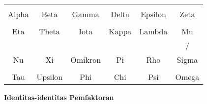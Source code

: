 \documentclass[12pt, a4paper]{article}\usepackage[utf8]{inputenc}
\theoremstyle{plain}
\theoremstyle{plain}
\numberwithin{equation}{section}
\theoremstyle{definition}
\begin{document}
	\begin{table}[!h]
		\centering
		
		\begin{tabular}{cccccc}
			{\LARGErr \textAlpha   \textalpha} \qquad \qquad &  {\LARGErr \textBeta   \textbeta} \qquad \qquad &   {\LARGErr\textGamma   \textgamma} \qquad \qquad &   {\LARGErr\textDelta   \textdelta} \qquad \qquad &   {\LARGErr\textEpsilon   \textepsilon} \qquad \qquad  &   {\LARGErr \textZeta   \textzeta}  \\
			Alpha \qquad \qquad & Beta \qquad \qquad & Gamma \qquad \qquad & Delta \qquad \qquad & Epsilon \qquad \qquad & Zeta \\[2em]
			{\LARGErr \textEta   \texteta} \qquad \qquad &  {\LARGErr \textTheta   \texttheta} \qquad \qquad &  {\LARGErr \textIota   \textiota} \qquad \qquad &  {\LARGErr \textKappa   \textkappa} \qquad \qquad &  {\LARGErr \textLambda   \textlambda} \qquad \qquad &   {\LARGErr \textMu   \textmu}  \\
			Eta \qquad \qquad & Theta \qquad \qquad & Iota \qquad \qquad & Kappa \qquad \qquad & Lambda \qquad \qquad & Mu \\[2em]
			{\LARGErr \textNu   \textnu} \qquad \qquad &  {\LARGErr \textXi   \textxi} \qquad \qquad &  {\LARGErr \textOmikron   \textomikron} \qquad \qquad &  {\LARGErr \textPi   \textpi} \qquad \qquad &  {\LARGErr \textRho   \textrho} \qquad \qquad &  {\LARGErr \textSigma  \textsigma/\textvarsigma}  \\
			Nu \qquad \qquad & Xi \qquad \qquad & Omikron \qquad \qquad & Pi \qquad \qquad & Rho \qquad \qquad & Sigma \\[2em]
			{\LARGErr\textTau   \texttau } \qquad \qquad &  {\LARGErr \textupsilon   \textUpsilon} \qquad \qquad &  {\LARGErr \textPhi   \textphi} \qquad \qquad &  {\LARGErr \textChi   \textchi} \qquad \qquad &  {\LARGErr \textPsi   \textpsi} \qquad \qquad & {\LARGErr \textOmega  \textomega}  \\
			Tau \qquad \qquad & Upsilon \qquad \qquad & Phi \qquad \qquad & Chi \qquad \qquad & Psi \qquad \qquad & Omega 
			
		\end{tabular}
		
	\end{table}
	
	\vspace{2em}
	
	\begin{center}
		\textbf{Identitas-identitas Pemfaktoran}
	\end{center}
	
\end{document}
